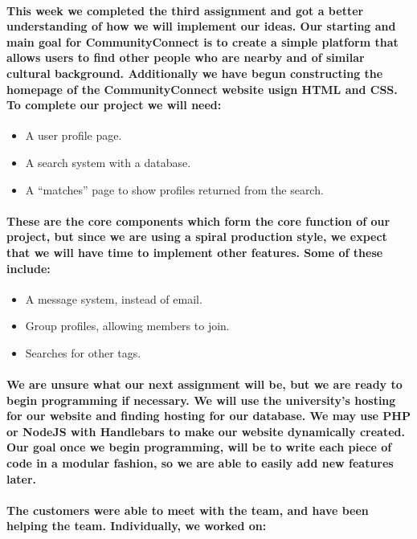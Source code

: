 \documentclass[12pt]{article}
\begin{document}
  \paragraph{\normalfont \indent This week we completed the third assignment and got a better understanding of how we will implement our ideas. Our starting and main goal for CommunityConnect is to create a simple platform that allows users to find other people who are nearby and of similar cultural background. Additionally we have begun constructing the homepage of the CommunityConnect website usign HTML and CSS. To complete our project we will need:
  }
   \begin{itemize}
    \item A user profile page.
    \item A search system with a database.
    \item A “matches” page to show profiles returned from the search.
   \end{itemize}

  \paragraph{\normalfont \indent These are the core components which form the core function of our project, but since we are using a spiral production style, we expect that we will have time to implement other features. Some of these include:
  }
   \begin{itemize}
    \item A message system, instead of email.
    \item Group profiles, allowing members to join.
    \item Searches for other tags.
   \end{itemize}

  \paragraph{\normalfont \indent We are unsure what our next assignment will be, but we are ready to begin programming if necessary. We will use the university’s hosting for our website and finding hosting for our database. We may use PHP or NodeJS with Handlebars to make our website dynamically created. Our goal once we begin programming, will be to write each piece of code in a modular fashion, so we are able to easily add new features later.
  }

  \paragraph{\normalfont \indent The customers were able to meet with the team, and have been helping the team. Individually, we worked on:
  }
\end{document}
